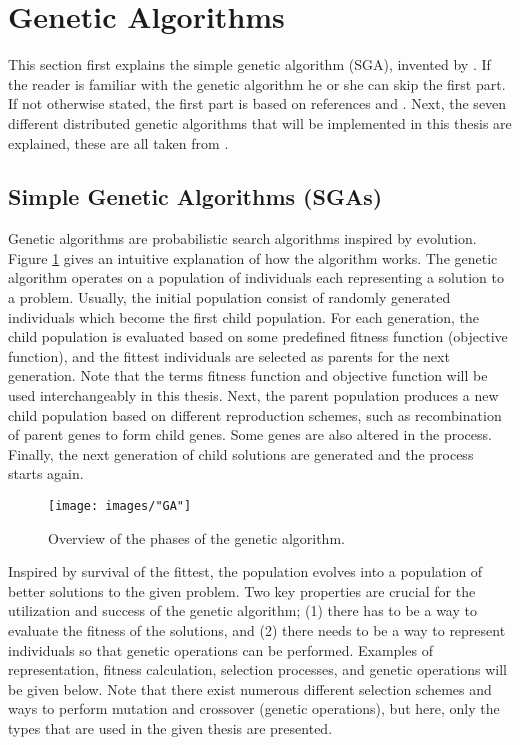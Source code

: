 \section{Genetic Algorithms}\label{section:ga}
This section first explains the simple genetic algorithm (SGA), invented by \cite{Holland}. If the reader is familiar with the genetic algorithm he or she can skip the first part. If not otherwise stated, the first part is based on references \citep{Holland} and \citep{Goldberg}. Next, the seven different distributed genetic algorithms that will be implemented in this thesis are explained, these are all taken from \cite{Gong}.


\subsection{Simple Genetic Algorithms (SGAs)}\label{subsection:sga}
Genetic algorithms are probabilistic search algorithms inspired by evolution. Figure \ref{GA} gives an intuitive explanation of how the algorithm works. The genetic algorithm operates on a population of individuals each representing a solution to a problem. Usually, the initial population consist of randomly generated individuals which become the first child population. For each generation, the child population is evaluated based on some predefined fitness function (objective function), and the fittest individuals are selected as parents for the next generation. Note that the terms fitness function and objective function will be used interchangeably in this thesis. Next, the parent population produces a new child population based on different reproduction schemes, such as recombination of parent genes to form child genes. Some genes are also altered in the process. Finally, the next generation of child solutions are generated and the process starts again.\\


\begin{figure}[h!]
\begin{center}
\texttt{[image: images/"GA"]}
\caption{Overview of the phases of the genetic algorithm.}
\label{GA}
\end{center}
\end{figure}


\noindent Inspired by survival of the fittest, the population evolves into a population of better solutions to the given problem. Two key properties are crucial for the utilization and success of the genetic algorithm; (1) there has to be a way to evaluate the fitness of the solutions, and (2) there needs to be a way to represent individuals so that genetic operations can be performed. Examples of representation, fitness calculation, selection processes, and genetic operations will be given below. Note that there exist numerous different selection schemes and ways to perform mutation and crossover (genetic operations), but here, only the types that are used in the given thesis are presented. \\


